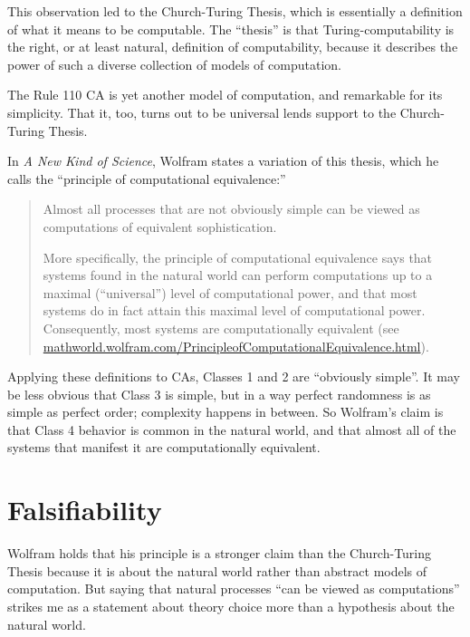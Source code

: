 \documentclass[12pt]{book}
\theoremstyle{exercise}
\begin{document}

This observation led to the Church-Turing Thesis, which is essentially
a definition of what it means to be computable.  The ``thesis'' is
that Turing-computability is the right, or at least natural,
definition of computability, because it describes the power of such a
diverse collection of models of computation.

The Rule 110 CA is yet another model of computation, and remarkable
for its simplicity.  That it, too, turns out to be universal lends
support to the Church-Turing Thesis.

In {\em A New Kind of Science}, Wolfram states a variation of this
thesis, which he calls the ``principle of computational equivalence:''


\begin{quote}
Almost all processes that are not obviously simple can be viewed as
computations of equivalent sophistication.

More specifically, the principle of computational equivalence says
that systems found in the natural world can perform computations up to
a maximal (``universal'') level of computational power, and that most
systems do in fact attain this maximal level of computational
power. Consequently, most systems are computationally
equivalent (see
  \url{mathworld.wolfram.com/PrincipleofComputationalEquivalence.html}).
\end{quote}

Applying these definitions to CAs, Classes 1 and 2 are ``obviously
simple''.  It may be less obvious that Class 3 is simple, but in a way
perfect randomness is as simple as perfect order; complexity happens
in between.  So Wolfram's claim is that Class 4 behavior is common in
the natural world, and that almost all of the systems that manifest it
are computationally equivalent.


\section{Falsifiability}

Wolfram holds that his principle is a stronger claim than the
Church-Turing Thesis because it is about the natural world rather
than abstract models of computation.  But saying that natural processes
``can be viewed as computations'' strikes me as a statement about
theory choice more than a hypothesis about the natural world.
\end{document}
